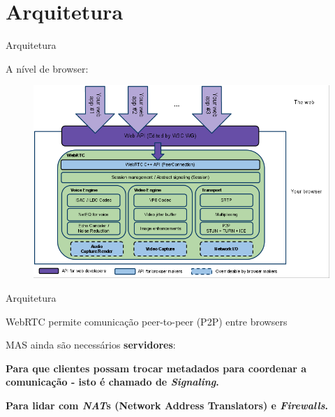 \section{Arquitetura}\label{arquitetura}

\begin{frame}{Arquitetura}

A nível de browser:

\begin{figure}[h]
    \includegraphics[scale=0.35]{img/webrtc-architecture.png}
\end{figure}

\end{frame}

\begin{frame}{Arquitetura}

WebRTC permite comunicação peer-to-peer (P2P) entre browsers

MAS ainda são necessários \textbf{servidores}:

\bigskip

\textbf{Para que clientes possam trocar metadados para coordenar a
comunicação - isto é chamado de \emph{Signaling}.}

\bigskip

\textbf{Para lidar com \emph{NAT}s (Network Address Translators) e
\emph{Firewalls}.}

\end{frame}

